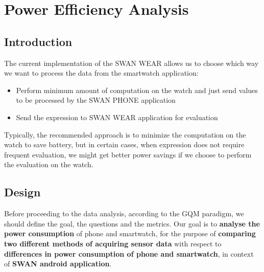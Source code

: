 
\chapter{Power Efficiency Analysis} %

\label{Chapter6} %



\section{Introduction}
The current implementation of the SWAN WEAR allows us to choose which way we want to process the data from the smartwatch application:
\begin{itemize}
 \item Perform minimum amount of computation on the watch and just send values to be processed by the SWAN PHONE application
 \item Send the expression to SWAN WEAR application for evaluation
\end{itemize}

Typically, the recommended approach is to minimize the computation on the watch to save battery, but in certain cases,  when expression does not require frequent evaluation, we might get better power savings if we choose to perform the evaluation on the watch.

\section{Design}
Before proceeding to the data analysis, according to the GQM\cite{gqm_1}\cite{gqm_2} paradigm, we should define the goal, the questions and the metrics.
    Our goal is to \textbf{analyse the power consumption} of phone and smartwatch, for the purpose of \textbf{comparing two different methods of acquiring sensor data}
    with respect to \textbf{differences in power consumption of phone and smartwatch}, in context of \textbf{SWAN android application}.

